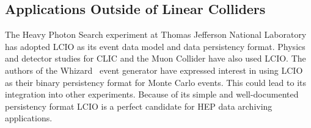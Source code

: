 \subsection{Applications Outside of Linear Colliders}
The Heavy Photon Search experiment at Thomas Jefferson National Laboratory
has adopted LCIO as its event data model and data persistency format. Physics
and detector studies for CLIC and the Muon Collider have also used LCIO.
The authors of the Whizard~\cite{whizardWebsite} event generator have expressed interest in using
LCIO as their binary persistency format for Monte Carlo events. This could lead
to its integration into other experiments. Because of its simple and
well-documented persistency format LCIO is a perfect candidate for HEP data
archiving applications.
